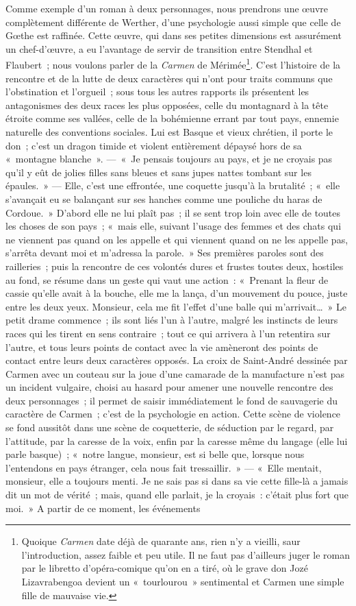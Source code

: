 \documentclass[french,twoside]{book} %
\begin{document}
Comme exemple d’un roman à deux personnages, nous prendrons une œuvre complètement différente de Werther, d’une psychologie aussi simple que celle de Gœthe est raffinée. Cette œuvre, qui dans ses petites dimensions est assurément un chef-d’œuvre, a eu l’avantage de servir de transition entre Stendhal et Flaubert ; nous voulons parler de la \emph{Carmen} de Mérimée\footnote{ Quoique \emph{Carmen} date déjà de quarante ans, rien n’y a vieilli, saur l’introduction, assez faible et peu utile. Il ne faut pas d’ailleurs juger le roman par le libretto d’opéra-comique qu’on en a tiré, où le grave don Jozé Lizavrabengoa devient un « tourlourou » sentimental et Carmen une simple fille de mauvaise vie.}. C’est l’histoire de la rencontre et de la lutte de deux caractères qui n’ont pour traits communs que l’obstination et l’orgueil ; sous tous les autres rapports ils présentent les antagonismes des deux races les plus opposées, celle du montagnard à la tête étroite comme ses vallées, celle de la bohémienne errant par tout pays, ennemie naturelle des conventions sociales. Lui est Basque et vieux chrétien, il porte le don ; c’est un dragon timide et violent entièrement dépaysé hors de sa « montagne blanche ». — « Je pensais toujours au pays, et je ne croyais pas qu’il y eût de jolies filles sans bleues et sans jupes nattes tombant sur les épaules. » — Elle, c’est une effrontée, une coquette jusqu’à la brutalité ; « elle s’avançait eu se balançant sur ses hanches comme une pouliche du haras de Cordoue. » D’abord elle ne lui plaît pas ; il se sent trop loin avec elle de toutes les choses de son pays ; « mais elle, suivant l’usage des femmes et des chats qui ne viennent pas quand on les appelle et qui viennent quand on ne les appelle pas, s’arrêta devant moi et m’adressa la parole. » Ses premières paroles sont des railleries ; puis la rencontre de ces volontés dures et frustes toutes deux, hostiles au fond, se résume dans un geste qui vaut une action : « Prenant la fleur de cassie qu’elle avait à la bouche, elle me la lança, d’un mouvement du pouce, juste entre les deux yeux. Monsieur, cela me fit l’effet d’une balle qui m’arrivait… » Le petit drame commence ; ils sont liés l’un à l’autre, malgré les instincts de leurs races qui les tirent en sens contraire ; tout ce qui arrivera à l’un retentira sur l’autre, et tous leurs points de contact avec la vie amèneront des points de contact entre leurs deux caractères opposés. La croix de Saint-André dessinée par Carmen avec un couteau sur la joue d’une camarade de la manufacture n’est pas un incident vulgaire, choisi au hasard pour amener une nouvelle rencontre des deux personnages ; il permet de saisir immédiatement le fond de sauvagerie du caractère de Carmen ; c’est de la psychologie en action. Cette scène de violence se fond aussitôt dans une scène de coquetterie, de séduction par le regard, par l’attitude, par la caresse de la voix, enfin par la caresse même du langage (elle lui parle basque) ; « notre langue, monsieur, est si belle que, lorsque nous l’entendons en pays étranger, cela nous fait tressaillir. » — « Elle mentait, monsieur, elle a toujours menti. Je ne sais pas si dans sa vie cette fille-là a jamais dit un mot de vérité ; mais, quand elle parlait, je la croyais : c’était plus fort que moi. » A partir de ce moment, les événements 
\end{document}
